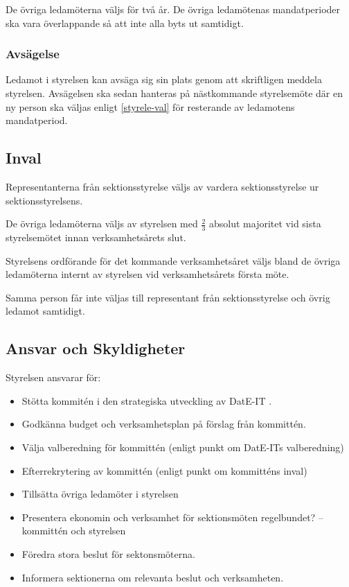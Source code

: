 \documentclass{article}
\begin{document}
De övriga ledamöterna väljs för två år. De övriga ledamötenas mandatperioder ska vara överlappande så att inte alla byts ut samtidigt.

\subsubsection{Avsägelse}
Ledamot i styrelsen kan avsäga sig sin plats genom att skriftligen meddela styrelsen. Avsägelsen ska sedan hanteras på nästkommande styrelsemöte där en ny person ska väljas enligt \ref{styrele-val} för resterande av ledamotens mandatperiod.

\subsection{Inval} \label{styrelse-val}
Representanterna från sektionsstyrelse väljs av vardera sektionsstyrelse ur sektionsstyrelsens.

De övriga ledamöterna väljs av styrelsen med $\frac{2}{3}$ absolut majoritet vid sista styrelsemötet innan verksamhetsårets slut.

Styrelsens ordförande för det kommande verksamhetsåret väljs bland de övriga ledamöterna internt av styrelsen vid verksamhetsårets första möte.

Samma person får inte väljas till representant från sektionsstyrelse och övrig ledamot samtidigt.

\subsection{Ansvar och Skyldigheter}
Styrelsen ansvarar för:
\begin{itemize}
    \item Stötta kommitén i den strategiska utveckling av DatE-IT .
    \item Godkänna budget och verksamhetsplan på förslag från kommittén.
    \item Välja valberedning för kommittén (enligt punkt om DatE-ITs valberedning)
    \item Efterrekrytering av kommittén (enligt punkt om kommitténs inval)
    \item Tillsätta övriga ledamöter i styrelsen
    \item Presentera ekonomin och verksamhet för sektionsmöten regelbundet? – kommittén och styrelsen
    \item Föredra stora beslut för sektonsmöterna.
    \item Informera sektionerna om relevanta beslut och verksamheten.
\end{itemize}
\end{document}
